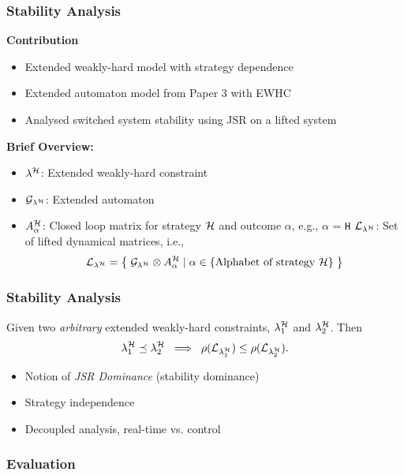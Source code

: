 \begin{frame}
    \frametitle{Stability Analysis}
    \textbf{Contribution} 
    \begin{itemize}
        \item Extended weakly-hard model with strategy dependence
        \item Extended automaton model from Paper 3 with EWHC
        \item Analysed switched system stability using JSR on a lifted system
    \end{itemize}

    \textbf{Brief Overview:}
    \begin{itemize}
        \item $\lambda^{\mathcal{H}}$: Extended weakly-hard constraint
        \item $\mathcal{G}_{\lambda^{\mathcal{H}}}$: Extended automaton
        \item $A_{\alpha}^{\mathcal{H}}$: Closed loop matrix for strategy $\mathcal{H}$ and outcome $\alpha$, e.g., $\alpha$ = \texttt{H}\newline
            $\mathcal{L}_{\lambda^{\mathcal{H}}}$: Set of lifted dynamical matrices, i.e.,
            $$\mathcal{L}_{\lambda^{\mathcal{H}}} = \left\{ \; \mathcal{G}_{\lambda^{\mathcal{H}}} \otimes A_{\alpha}^{\mathcal{H}} \; | \; \alpha \in \{\text{Alphabet of strategy }\mathcal{H}\} \;\right\}$$
    \end{itemize}

\end{frame}

\begin{frame}
    \frametitle{Stability Analysis}
    \begin{theorem}
        Given two \emph{arbitrary} extended weakly-hard constraints, $\lambda^{\mathcal{H}}_1$ and $\lambda^{\mathcal{H}}_2$.\newline
        Then 
        \begin{equation*}
            \lambda^{\mathcal{H}}_1 \preceq \lambda^{\mathcal{H}}_2 \; \implies \; \rho(\mathcal{L}_{\lambda^{\mathcal{H}}_1}) \leq \rho(\mathcal{L}_{\lambda^{\mathcal{H}}_2}).
        \end{equation*}
    \end{theorem}%
    \begin{itemize}
        \item<2-> Notion of \emph{JSR Dominance} (stability dominance)%
        \item<3-> Strategy independence%
        \item<4-> Decoupled analysis, real-time vs. control%
    \end{itemize}
\end{frame}

\begin{frame}
    \frametitle{Evaluation}
    \centering
    \resizebox{0.6\textwidth}{!}{}
\end{frame}
